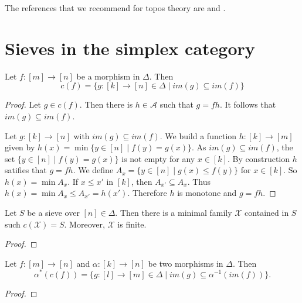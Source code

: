 The references that we recommend for topos theory are \cite{TT} and \cite{SGL}.

\section{Sieves in the simplex category}
\label{sec:2}

\begin{proposition}
Let $f\colon[m]\longrightarrow [n]$ be a morphism in $\Delta$. Then 
\[c(f)=\{g\colon [k]\longrightarrow [n]\in\Delta\mid im(g)\subseteq im(f)\}
\]
\end{proposition}

\begin{proof}
Let $g\in c(f)$. Then there is $h\in\mathcal{A}$ such that $g=fh$. It follows that $im(g)\subseteq im(f)$.

Let $g\colon [k]\longrightarrow[n]$ with $im(g)\subseteq im(f)$. We build a function $h\colon [k]\longrightarrow [m]$ given by $h(x)=\min\{y\in [n]\mid f(y)=g(x)\}$. As $im(g)\subseteq im(f)$, the set $\{y\in [n]\mid f(y)=g(x)\}$ is not empty for any $x\in [k]$. By construction $h$ satifies that $g=fh$. We define $A_x=\{y\in [n]\mid g(x)\leq f(y)\}$ for $x\in [k]$. So $h(x)=\min A_x$. If $x\leq x'$ in $[k]$, then $A_{x'}\subseteq A_x$. Thus $h(x)=\min A_x\leq A_{x'}=h(x')$. Therefore $h$ is monotone and $g=fh$.
\end{proof}

\begin{proposition}
Let $S$ be a sieve over $[n]\in\Delta$. Then there is a minimal family $\mathcal{X}$ contained in $S$ such $c(\mathcal{X})=S$. Moreover, $\mathcal{X}$ is finite.
\end{proposition}

\begin{proof}

\end{proof}

\begin{proposition}
Let $f\colon [m]\longrightarrow [n]$ and $\alpha\colon [k]\longrightarrow [n]$ be two morphisms in $\Delta$. Then
\[
\alpha^*(c(f))=\{g\colon [l]\longrightarrow[m]\in\Delta\mid im(g)\subseteq \alpha^{-1}(im(f))\}.
\]
\end{proposition}

\begin{proof}

\end{proof}

